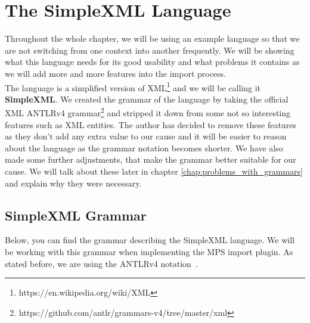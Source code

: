 \section{The SimpleXML Language}

Throughout the whole chapter, we will be using an example language so that we are not switching from one context into another frequently.
We will be showing what this language needs for its good usability and what problems it contains as we will add more and more features into the import process.
\\

The language is a simplified version of XML\footnote{https://en.wikipedia.org/wiki/XML} and we will be calling it \textbf{SimpleXML}.
We created the grammar of the language by taking the official XML ANTLRv4 grammar\footnote{https://github.com/antlr/grammars-v4/tree/master/xml} and stripped it down from some not so interesting features such as XML entities.
The author has decided to remove these features as they don't add any extra value to our cause and it will be easier to reason about the language as the grammar notation becomes shorter.
We have also made some further adjustments, that make the grammar better suitable for our cause.
We will talk about these later in chapter \ref{chap:problems_with_grammars} and explain why they were necessary.

\newpage

\subsection{SimpleXML Grammar}
\label{chap:simplexml_grammar}

Below, you can find the grammar describing the SimpleXML language.
We will be working with this grammar when implementing the MPS import plugin.
As stated before, we are using the ANTLRv4 notation~\cite{ANTLR4reference}.

